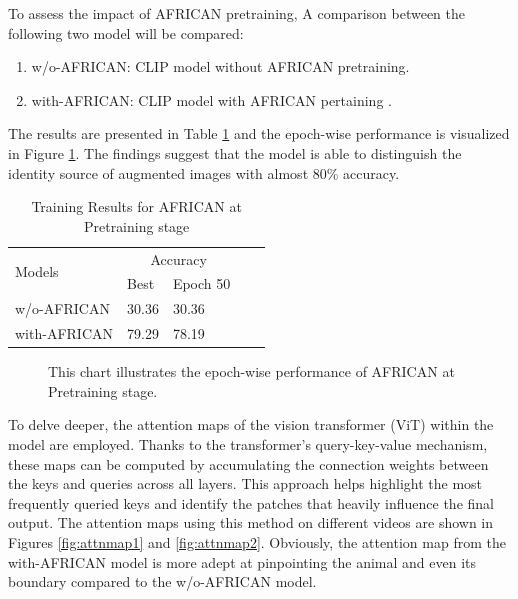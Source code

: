 To assess the impact of AFRICAN pretraining, A comparison between the following two model will be compared: 

\begin{enumerate}
    \item w/o-AFRICAN: CLIP model without AFRICAN pretraining.
    \item with-AFRICAN: CLIP model with AFRICAN pertaining .
\end{enumerate}

The results are presented in Table \ref{tab:africanpretrainingresults} and the epoch-wise performance is visualized in Figure \ref{fig:tp_africanpretraining}. The findings suggest that the model is able to distinguish the identity source of augmented images with almost 80\% accuracy. 

\begin{table}[ht]
    \centering
    \caption{Training Results for AFRICAN at Pretraining stage}
    \label{tab:africanpretrainingresults}
    \begin{tabular}{lllll}
        \toprule
        \multirow{2}{*}{Models} & \multicolumn{2}{c}{Accuracy} \\
        \cmidrule{2-3} 
        {} &  Best & Epoch 50\\
        \midrule
        w/o-AFRICAN   & 30.36 & 30.36 \\
        with-AFRICAN  & 79.29 & 78.19 \\
        \bottomrule
    \end{tabular}
\end{table}

\begin{figure}[ht]
    \centering
    \resizebox{1.0\textwidth}{!}{}
    \caption[Accuracy of AFRICAN on each Epoch at Pretraining stage]{This chart illustrates the epoch-wise performance of AFRICAN at Pretraining stage.}
    \label{fig:tp_africanpretraining}
\end{figure}

To delve deeper, the attention maps of the vision transformer (ViT) within the model are employed. Thanks to the transformer's query-key-value mechanism, these maps can be computed by accumulating the connection weights between the keys and queries across all layers. This approach helps highlight the most frequently queried keys and identify the patches that heavily influence the final output. The attention maps using this method on different videos are shown in Figures \ref{fig:attnmap1} and \ref{fig:attnmap2}. Obviously, the attention map from the with-AFRICAN model is more adept at pinpointing the animal and even its boundary compared to the w/o-AFRICAN model.

